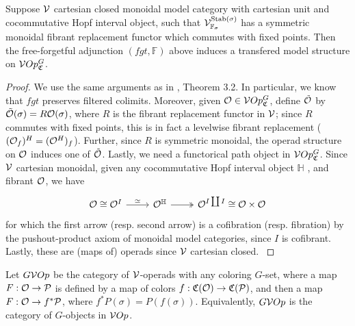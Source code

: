 \documentclass[psamsfonts,onesided,10pt,letterpaper]{amsart}%
\renewcommand{\C}{\ensuremath{\mathfrak{C}}}
\newcommand{\FF}{\ensuremath{\mathbb{F}}}
\renewcommand{\H}{\ensuremath{\mathbb{H}}}
\renewcommand{\P}{\ensuremath{\mathcal{P}}}
\newcommand{\N}{\mathbb N}
\begin{document}
\begin{proposition}
  Suppose $\mathcal V$ cartesian closed monoidal model category with cartesian unit and cocommutative Hopf interval object, such that $\mathcal V^{\mathrm{Stab}(\sigma)}_{\mathbb{F}_\sigma}$ has a symmetric monoidal fibrant replacement functor which commutes with fixed points. Then the free-forgetful adjunction $(fgt, \FF)$ above 
induces a transfered model structure on $\V Op^G_\C$.
\end{proposition}
\begin{proof}
      We use the same arguments as in \cite{BM03}, Theorem 3.2. In particular, we know that $fgt$ preserves filtered colimits. Moreover, given $\O\in \V Op^G_\C$, define $\tilde {\mathcal{O}}$ by $\tilde {\mathcal{O}}(\sigma) = R\mathcal{O}(\sigma)$, where $R$ is the fibrant replacement functor in $\mathcal V$; since $R$ commutes with fixed points, this is in fact a levelwise fibrant replacement ($(\mathcal{O}_f)^H = (\mathcal{O}^H)_f$). Further, since $R$ is symmetric monoidal, the operad structure on $\mathcal{O}$ induces one of $\tilde {\mathcal{O}}$.
      {\color{red}
        Lastly, we need a functorical path object in $\V Op^G_\C$. Since $\mathcal V$ cartesian monoidal, given any cocommutative Hopf interval object $\H$ , and fibrant $\mathcal{O}$, we have 
        \[
              \begin{tikzcd}
                    \O \cong \O^I \arrow[r,"\simeq"] & \O^\H \arrow[r,twoheadrightarrow] & \O^{I\coprod I} \cong \O\times \O
              \end{tikzcd}
        \]
        for which the first arrow (resp. second arrow) is a cofibration (resp. fibration) by the pushout-product axiom of monoidal model categories, since $I$ is cofibrant. Lastly, these are (maps of) operads since $\mathcal V$ cartesian closed.
      } %
\end{proof}

\begin{definition}
  Let $G\mathcal V Op$ be the category of $\mathcal V$-operads with any coloring $G$-set, where a map $F: \O\to \P$ is defined by a map of colors $f: \C(\O)\to \C(\P)$, and then a map $F: \O\to f^*\P$, where $f^*P(\sigma) = P(f(\sigma))$. Equivalently, $G\mathcal V Op$ is the category of $G$-objects in $\mathcal V Op$. 
\end{definition}
\end{document}
